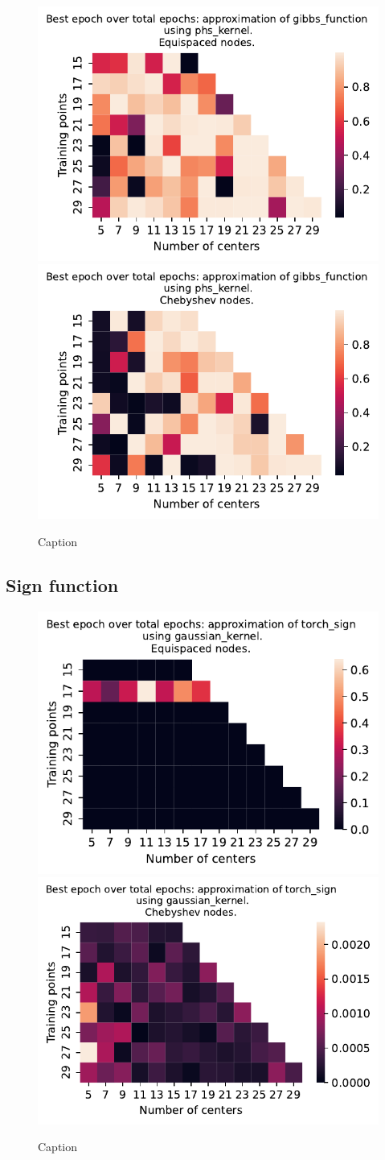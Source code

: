 \documentclass[12pt]{report} %
\begin{document}
\begin{figure}[ht]
  \centering

  \includegraphics[width=.49\textwidth]{imagenes/experiments/1d/variational_epochs/gibbs_function-Kphs_kernel-Equi-epochs.pdf}
  \includegraphics[width=.49\textwidth]{imagenes/experiments/1d/variational_epochs/gibbs_function-Kphs_kernel-Cheb-epochs.pdf}
  \caption{Caption}
  \label{fig:epochs-gibbs-phs}
\end{figure}


\subsection*{Sign function}

\begin{figure}[ht]
  \centering

  \includegraphics[width=.49\textwidth]{imagenes/experiments/1d/variational_epochs/torch_sign-Kgaussian_kernel-Equi-epochs.pdf}
  \includegraphics[width=.49\textwidth]{imagenes/experiments/1d/variational_epochs/torch_sign-Kgaussian_kernel-Cheb-epochs.pdf}
  \caption{Caption}
  \label{fig:epochs-torch-sign-gaussian}
\end{figure}
\end{document}
